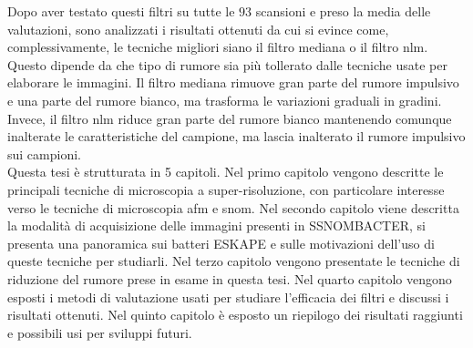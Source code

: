 \documentclass[../main.tex]{subfiles}
\begin{document}
Dopo aver testato questi filtri su tutte le $93$ scansioni e preso la media delle valutazioni, sono analizzati i risultati ottenuti da cui si evince come, complessivamente, le tecniche migliori siano il filtro mediana o il filtro \acrshort{nlm}. Questo dipende da che tipo di rumore sia più tollerato dalle tecniche usate per elaborare le immagini. Il filtro mediana rimuove gran parte del rumore impulsivo e una parte del rumore bianco, ma trasforma le variazioni graduali in gradini. Invece, il filtro \acrshort{nlm} riduce gran parte del rumore bianco mantenendo comunque inalterate le caratteristiche del campione, ma lascia inalterato il rumore impulsivo sui campioni.\\

\noindent Questa tesi è strutturata in 5 capitoli. Nel primo capitolo vengono descritte le principali tecniche di microscopia a super-risoluzione, con particolare interesse verso le tecniche di microscopia \acrshort{afm} e \acrshort{snom}. Nel secondo capitolo viene descritta la modalità di acquisizione delle immagini presenti in SSNOMBACTER\cite{ssnombacter}, si presenta una panoramica sui batteri ESKAPE\cite{eskape} e sulle motivazioni dell'uso di queste tecniche per studiarli. Nel terzo capitolo vengono presentate le tecniche di riduzione del rumore prese in esame in questa tesi. Nel quarto capitolo vengono esposti i metodi di valutazione usati per studiare l'efficacia dei filtri e discussi i risultati ottenuti. Nel quinto capitolo è esposto un riepilogo dei risultati raggiunti e possibili usi per sviluppi futuri.
\end{document}
